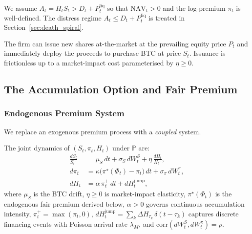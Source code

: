 \begin{assumption}
  \label{ass:operating_regime}
  We assume $A_t = H_t S_t > D_t + P_t^{\mathrm{liq}}$ so that
  $\mathrm{NAV}_t > 0$ and the log-premium $\pi_t$ is well-defined.
  The distress regime $A_t \le D_t + P_t^{\mathrm{liq}}$ is treated
  in Section~\ref{sec:death_spiral}.
\end{assumption}

\begin{assumption}
  \label{ass:issuance}
  The firm can issue new shares at-the-market at the prevailing equity price
  $P_t$ and immediately deploy the proceeds to purchase BTC at price $S_t$.
  Issuance is frictionless up to a market-impact cost parameterised by
  $\eta \ge 0$.
\end{assumption}

\subsection{The Accumulation Option and Fair Premium}\label{sec:fair_premium}

\subsubsection{Endogenous Premium System}\label{sec:coupled_system}

We replace an exogenous premium process with a \emph{coupled} system.

\begin{definition}
  \label{def:coupled_sdes}
  The joint dynamics of $(S_t, \pi_t, H_t)$ under $\mathbb{P}$ are:
  \begin{align}
    \frac{dS_t}{S_{t^-}} &= \mu_S\,dt + \sigma_S\,dW_t^S
      + \eta\,\frac{dH_t}{H_{t^-}},
    \label{eq:btc_impact} \\[6pt]
    d\pi_t &= \kappa\bigl(\pi^\star(\Phi_t) - \pi_t\bigr)\,dt
      + \sigma_\pi\,dW_t^\pi,
    \label{eq:premium_endo} \\[6pt]
    dH_t &= \alpha\,\pi_t^+\,dt + dH_t^{\mathrm{jump}},
    \label{eq:holdings_endo}
  \end{align}
  where $\mu_S$ is the BTC drift, $\eta \ge 0$ is market-impact elasticity,
  $\pi^\star(\Phi_t)$ is the endogenous fair premium derived below,
  $\alpha > 0$ governs continuous accumulation intensity,
  $\pi_t^+ = \max(\pi_t,0)$,
  $dH_t^{\mathrm{jump}} = \sum_k \Delta H_{\tau_k}\,\delta(t - \tau_k)$
  captures discrete financing events with Poisson arrival rate $\lambda_M$,
  and $\mathrm{corr}(dW_t^S, dW_t^\pi) = \rho$.
\end{definition}

